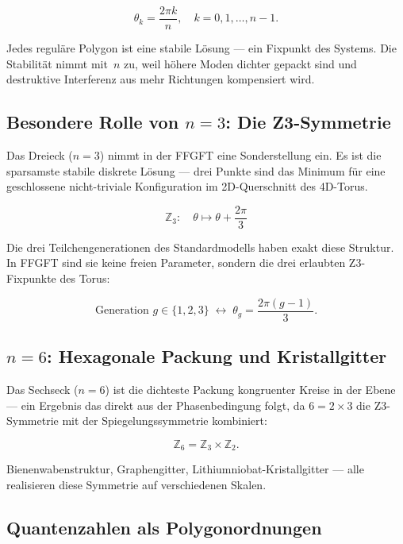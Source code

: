 \begin{equation}
  \theta_k = \frac{2\pi k}{n}, \quad k = 0, 1, \ldots, n-1.
\end{equation}

Jedes reguläre Polygon ist eine stabile Lösung — ein Fixpunkt des Systems.
Die Stabilität nimmt mit~$n$ zu, weil höhere Moden dichter gepackt sind
und destruktive Interferenz aus mehr Richtungen kompensiert wird.

\subsection{Besondere Rolle von $n = 3$: Die Z3-Symmetrie}

Das Dreieck ($n=3$) nimmt in der FFGFT eine Sonderstellung ein. Es ist
die sparsamste stabile diskrete Lösung — drei Punkte sind das Minimum
für eine geschlossene nicht-triviale Konfiguration im 2D-Querschnitt
des 4D-Torus.

\begin{equation}
  \mathbb{Z}_3: \quad \theta \mapsto \theta + \frac{2\pi}{3}
\end{equation}

Die drei Teilchengenerationen des Standardmodells haben exakt diese Struktur.
In FFGFT sind sie keine freien Parameter, sondern die drei erlaubten
Z3-Fixpunkte des Torus:

\begin{equation}
  \text{Generation } g \in \{1, 2, 3\}
  \;\longleftrightarrow\;
  \theta_g = \frac{2\pi(g-1)}{3}.
\end{equation}

\subsection{$n = 6$: Hexagonale Packung und Kristallgitter}

Das Sechseck ($n=6$) ist die dichteste Packung kongruenter Kreise in
der Ebene — ein Ergebnis das direkt aus der Phasenbedingung folgt, da
$6 = 2 \times 3$ die Z3-Symmetrie mit der Spiegelungssymmetrie kombiniert:

\begin{equation}
  \mathbb{Z}_6 = \mathbb{Z}_3 \times \mathbb{Z}_2.
\end{equation}

Bienenwabenstruktur, Graphengitter, Lithiumniobat-Kristallgitter — alle
realisieren diese Symmetrie auf verschiedenen Skalen.

\subsection{Quantenzahlen als Polygonordnungen}

